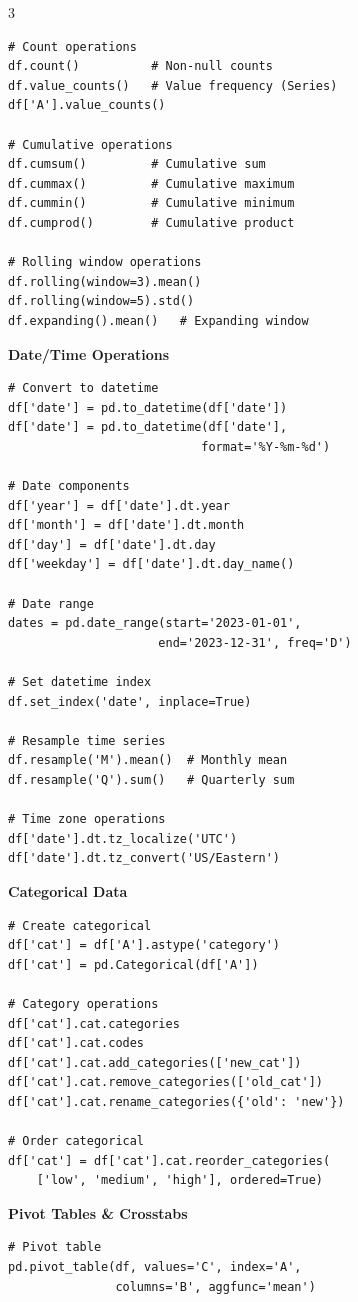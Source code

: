 \documentclass[10pt,landscape,letterpaper]{article}
\newcommand{\sect}[1]{\textbf{\color{blue}#1}}
\begin{document}
\begin{multicols}{3}
\begin{lstlisting}
# Count operations
df.count()          # Non-null counts
df.value_counts()   # Value frequency (Series)
df['A'].value_counts()

# Cumulative operations
df.cumsum()         # Cumulative sum
df.cummax()         # Cumulative maximum
df.cummin()         # Cumulative minimum
df.cumprod()        # Cumulative product

# Rolling window operations
df.rolling(window=3).mean()
df.rolling(window=5).std()
df.expanding().mean()   # Expanding window
\end{lstlisting}

\sect{Date/Time Operations}
\begin{lstlisting}
# Convert to datetime
df['date'] = pd.to_datetime(df['date'])
df['date'] = pd.to_datetime(df['date'], 
                           format='%Y-%m-%d')

# Date components
df['year'] = df['date'].dt.year
df['month'] = df['date'].dt.month
df['day'] = df['date'].dt.day
df['weekday'] = df['date'].dt.day_name()

# Date range
dates = pd.date_range(start='2023-01-01', 
                     end='2023-12-31', freq='D')

# Set datetime index
df.set_index('date', inplace=True)

# Resample time series
df.resample('M').mean()  # Monthly mean
df.resample('Q').sum()   # Quarterly sum

# Time zone operations
df['date'].dt.tz_localize('UTC')
df['date'].dt.tz_convert('US/Eastern')
\end{lstlisting}

\sect{Categorical Data}
\begin{lstlisting}
# Create categorical
df['cat'] = df['A'].astype('category')
df['cat'] = pd.Categorical(df['A'])

# Category operations
df['cat'].cat.categories
df['cat'].cat.codes
df['cat'].cat.add_categories(['new_cat'])
df['cat'].cat.remove_categories(['old_cat'])
df['cat'].cat.rename_categories({'old': 'new'})

# Order categorical
df['cat'] = df['cat'].cat.reorder_categories(
    ['low', 'medium', 'high'], ordered=True)
\end{lstlisting}

\columnbreak

\sect{Pivot Tables \& Crosstabs}
\begin{lstlisting}
# Pivot table
pd.pivot_table(df, values='C', index='A', 
               columns='B', aggfunc='mean')


\end{lstlisting}
\end{multicols}
\end{document}
